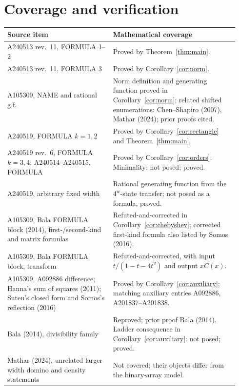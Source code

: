 \documentclass[11pt]{article}
\begin{document}
\section{Coverage and verification}
\begin{longtable}{@{}p{0.43\linewidth}p{0.51\linewidth}@{}}
\toprule
Source item & Mathematical coverage\\
\midrule
A240513 rev.~11, FORMULA 1--2 & Proved by Theorem~\ref{thm:main}.\\
A240513 rev.~11, FORMULA 3 & Proved by Corollary~\ref{cor:norm}.\\
A105309, NAME and rational g.f. & Norm definition and generating function
proved in Corollary~\ref{cor:norm}; related shifted enumerations:
Chen--Shapiro (2007), Mathar (2024); prior proofs cited.\\
A240519, FORMULA $k=1,2$ & Proved by Corollary~\ref{cor:rectangle}
and Theorem~\ref{thm:main}.\\
A240519 rev.~6, FORMULA $k=3,4$; A240514--A240515, FORMULA &
Proved by Corollary~\ref{cor:orders}. Minimality: not posed; proved.\\
A240519, arbitrary fixed width & Rational generating function from the
$4^w$-state transfer; not posed as a formula, proved.\\
A105309, Bala FORMULA block (2014), first-/second-kind and matrix formulas &
Refuted-and-corrected in Corollary~\ref{cor:chebyshev}; corrected first-kind
formula also listed by Somos (2016).\\
A105309, Bala FORMULA block, transform & Refuted-and-corrected, with
input $t/(1-t-4t^2)$ and output $xC(x)$.\\
A105309, A092886 difference; Hanna's sum of squares (2011);
Suteu's closed form and Somos's reflection (2016) &
Proved by Corollary~\ref{cor:auxiliary}; matching auxiliary entries
A092886, A201837--A201838.\\
Bala (2014), divisibility family & Reproved; prior proof Bala (2014).
Ladder consequence in Corollary~\ref{cor:auxiliary}: not posed; proved.\\
Mathar (2024), unrelated larger-width domino and density statements &
Not covered; their objects differ from the binary-array model.\\
\bottomrule
\end{longtable}
\end{document}
